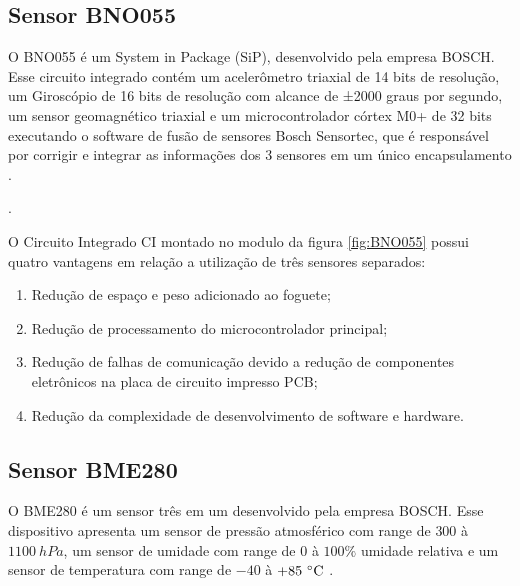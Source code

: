 \subsection{Sensor BNO055}\label{subsec:BNO055}



O BNO055 é um System in Package (SiP), desenvolvido pela empresa BOSCH. Esse circuito integrado contém um acelerômetro triaxial de 14 bits de resolução, um Giroscópio de 16 bits de resolução com alcance de ±2000 graus por segundo, um sensor geomagnético triaxial e um microcontrolador córtex M0+ de 32 bits executando o software de fusão de sensores Bosch Sensortec, que é responsável por corrigir e integrar as informações dos 3 sensores em um único encapsulamento \cite{BOSCH2021}.  


 .




O  Circuito Integrado CI montado no modulo da figura \ref{fig:BNO055} possui quatro vantagens em relação a utilização de três sensores separados:


 \begin{enumerate}
   \item Redução de espaço e peso adicionado ao foguete;
   \item Redução de processamento do microcontrolador principal;
   \item Redução de falhas de comunicação devido a redução de componentes eletrônicos na placa de circuito impresso PCB;
   \item Redução da complexidade de desenvolvimento de software e hardware.
 \end{enumerate}


















\newpage
\subsection{Sensor BME280}


O BME280 é um sensor três em um desenvolvido pela empresa BOSCH. Esse dispositivo apresenta um sensor de pressão atmosférico com range de $300$ à $1100 \ hPa$, um sensor de umidade com range de $0$ à $100\% $ umidade relativa e um sensor de temperatura com range de $-40$ à $+85 \ \celsius$ \cite{BMP280}.

